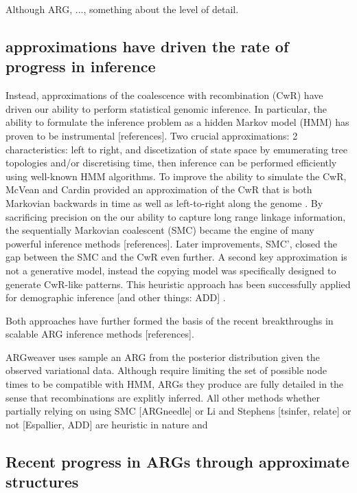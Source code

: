 \documentclass{article}
\begin{document}
Although ARG, ...,
something about the level of detail.

\subsection{approximations have driven the rate of progress in inference}

Instead, approximations of the coalescence with recombination (CwR) have  
driven our ability to perform statistical genomic inference. In particular, 
the ability to formulate the inference problem as a hidden Markov model (HMM) 
has proven to be instrumental [references]. 
Two crucial approximations: 2 characteristics: left to right, and discetization 
of state space by emumerating tree topologies and/or discretising time,
then inference can be performed efficiently using well-known HMM algorithms.
To improve the ability to simulate the CwR, McVean and Cardin 
provided an approximation of the CwR that is both Markovian backwards in time 
as well as left-to-right along the genome \citep{mcvean_2005_approximating}. 
By sacrificing precision on the our ability to capture long range linkage 
information, the sequentially Markovian coalescent (SMC) 
became the engine of many powerful inference methods [references]. 
Later improvements, SMC', closed the gap between the SMC and the CwR even 
further.
A second key approximation is not a generative model, instead the  
copying model \citep{li_2003_modeling} was specifically designed to 
generate CwR-like patterns. This heuristic approach has been successfully 
applied for demographic inference [and other things: ADD] 
\citep{sheehan_2013_estimating, steinrucken_2018}.

Both approaches have further formed the basis of the recent breakthroughs in 
scalable ARG inference methods [references]. 

ARGweaver uses 
sample an ARG from the posterior distribution given the observed variational 
data. Although require limiting the set of possible node times to be compatible 
with HMM, ARGs they produce are fully detailed in the sense that recombinations 
are explitly inferred. 
All other methods whether partially relying on
using SMC [ARGneedle] or Li and Stephens [tsinfer, relate] or not [Espallier, ADD] 
are heuristic in nature and %



\subsection{Recent progress in ARGs through approximate structures}
\end{document}
